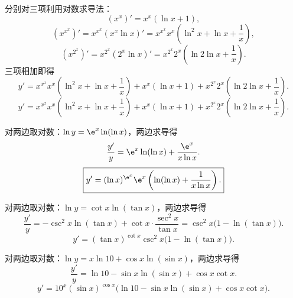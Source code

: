 \begin{solution}
    分别对三项利用对数求导法：
    \begin{equation}
        (x^x)' = x^x(\ln x + 1),
    \end{equation}
    \begin{equation}
        (x^{x^x})' = x^{x^x}\left( x^x\ln x \right)' = x^{x^x} x^x \left( \ln^2 x + \ln x + \frac{1}{x} \right),
    \end{equation}
    \begin{equation}
        (x^{2^x})' = x^{2^x}\left( 2^x\ln x \right)' = x^{2^x} 2^x \left( \ln 2\ln x + \frac{1}{x} \right).
    \end{equation}
    三项相加即得
    \begin{equation}
        y' = x^{x^x} x^x \left( \ln^2 x + \ln x + \frac{1}{x} \right) + x^x(\ln x + 1) + x^{2^x} 2^x \left( \ln 2\ln x + \frac{1}{x} \right).
    \end{equation}
    \begin{equation}
        \boxed{y' = x^{x^x} x^x \left( \ln^2 x + \ln x + \frac{1}{x} \right) + x^x(\ln x + 1) + x^{2^x} 2^x \left( \ln 2\ln x + \frac{1}{x} \right).}
    \end{equation}


    对两边取对数：$\ln y = \e^x \ln(\ln x)$，两边求导得
    \begin{equation}
        \frac{y'}{y} = \e^x \ln(\ln x) + \frac{\e^x}{x\ln x}.
    \end{equation}
    \begin{equation}
        \boxed{y' = (\ln x)^{\e^x} \e^x \left( \ln(\ln x) + \frac{1}{x\ln x} \right).}
    \end{equation}


    对两边取对数：$\ln y = \cot x \ln(\tan x)$，两边求导得
    \begin{equation}
        \frac{y'}{y} = -\csc^2 x \ln(\tan x) + \cot x \cdot \frac{\sec^2 x}{\tan x} = \csc^2 x \bigl( 1 - \ln(\tan x) \bigr).
    \end{equation}
    \begin{equation}
        \boxed{y' = (\tan x)^{\cot x} \csc^2 x \bigl( 1 - \ln(\tan x) \bigr).}
    \end{equation}


    对两边取对数：$\ln y = x\ln 10 + \cos x \ln(\sin x)$，两边求导得
    \begin{equation}
        \frac{y'}{y} = \ln 10 - \sin x\ln(\sin x) + \cos x\cot x.
    \end{equation}
    \begin{equation}
        \boxed{y' = 10^x (\sin x)^{\cos x} \bigl( \ln 10 - \sin x\ln(\sin x) + \cos x\cot x \bigr).}
    \end{equation}


\end{solution}
